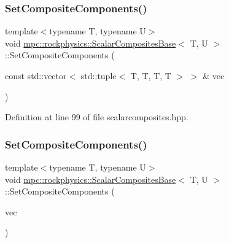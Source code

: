 \subsubsection{\texorpdfstring{Set\+Composite\+Components()}{SetCompositeComponents()}\hspace{0.1cm}{\footnotesize\ttfamily [1/2]}}
{\footnotesize\ttfamily template$<$typename T, typename U$>$ \\
void \mbox{\hyperlink{classmpc_1_1rockphysics_1_1_scalar_composites_base}{mpc\+::rockphysics\+::\+Scalar\+Composites\+Base}}$<$ T, U $>$\+::Set\+Composite\+Components (\begin{DoxyParamCaption}\item[{const std\+::vector$<$ std\+::tuple$<$ T, T, T, T $>$ $>$ \&}]{vec }\end{DoxyParamCaption})\hspace{0.3cm}{\ttfamily [inline]}}



Definition at line 99 of file scalarcomposites.\+hpp.

\mbox{\label{classmpc_1_1rockphysics_1_1_scalar_composites_base_a1866cddad44ffcc54ef178eb914cad2c}} 
\subsubsection{\texorpdfstring{Set\+Composite\+Components()}{SetCompositeComponents()}\hspace{0.1cm}{\footnotesize\ttfamily [2/2]}}
{\footnotesize\ttfamily template$<$typename T, typename U$>$ \\
void \mbox{\hyperlink{classmpc_1_1rockphysics_1_1_scalar_composites_base}{mpc\+::rockphysics\+::\+Scalar\+Composites\+Base}}$<$ T, U $>$\+::Set\+Composite\+Components (\begin{DoxyParamCaption}\item[{const std\+::vector$<$ std\+::tuple$<$ \mbox{\hyperlink{structmpc_1_1rockphysics_1_1_bulk_modulus_type}{mpc\+::rockphysics\+::\+Bulk\+Modulus\+Type}}$<$ T $>$, \mbox{\hyperlink{structmpc_1_1rockphysics_1_1_shear_modulus_type}{mpc\+::rockphysics\+::\+Shear\+Modulus\+Type}}$<$ T $>$, \mbox{\hyperlink{structmpc_1_1rockphysics_1_1_density_type}{mpc\+::rockphysics\+::\+Density\+Type}}$<$ T $>$, \mbox{\hyperlink{structmpc_1_1rockphysics_1_1_volume_fraction_type}{mpc\+::rockphysics\+::\+Volume\+Fraction\+Type}}$<$ T $>$ $>$ $>$ \&}]{vec }\end{DoxyParamCaption})\hspace{0.3cm}{\ttfamily [inline]}}



